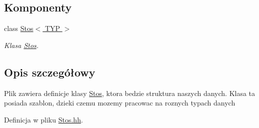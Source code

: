 \subsection*{Komponenty}
\begin{DoxyCompactItemize}
\item 
class \hyperlink{class_stos}{Stos$<$ TYP $>$}
\begin{DoxyCompactList}\small\item\em Klasa \hyperlink{class_stos}{Stos}. \item\end{DoxyCompactList}\end{DoxyCompactItemize}


\subsection{Opis szczegółowy}
Plik zawiera definicje klasy \hyperlink{class_stos}{Stos}, ktora bedzie struktura naszych danych. Klasa ta posiada szablon, dzieki czemu mozemy pracowac na roznych typach danych 

Definicja w pliku \hyperlink{_stos_8hh_source}{Stos.hh}.

